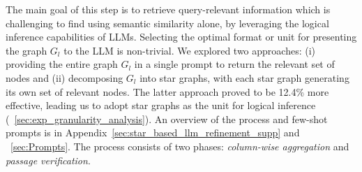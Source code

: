 The main goal of this step is to retrieve query-relevant information which is challenging to find using semantic similarity alone, by leveraging the logical inference capabilities of LLMs.
Selecting the optimal format or unit for presenting the graph $G_l$ to the LLM is non-trivial.
We explored two approaches: (i) providing the entire graph $G_l$ in a single prompt to return the relevant set of nodes and (ii) decomposing $G_l$ into star graphs, with each star graph generating its own set of relevant nodes.
The latter approach proved to be 12.4\% more effective, leading us to adopt star graphs as the unit for logical inference (\textsection~\ref{sec:exp_granularity_analysis}). 
An overview of the process and few-shot prompts is in Appendix~\ref{sec:star_based_llm_refinement_supp} and \textsection~\ref{sec:Prompts}.
The process consists of two phases: \emph{column-wise aggregation} and \emph{passage verification}.




